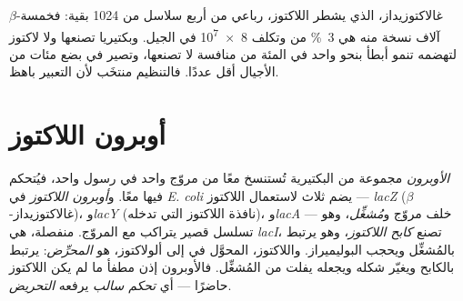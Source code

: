 \begin{example}\label{ex:b1:expression-control:economy}
 $\beta$-غالاكتوزيداز، الذي يشطر اللاكتوز، رباعي من أربع
سلاسل من \qty{1024}{} بقية: فخمسة آلاف نسخة منه هي \qty{3}{\%} من
  وتكلف \qty{8e7}{}  في الجيل. وبكتيريا تصنعها ولا
لاكتوز لتهضمه تنمو أبطأ بنحو واحد في المئة من منافسة لا تصنعها،
وتصير في بضع مئات من الأجيال أقل عددًا. فالتنظيم منتخَب لأن التعبير
باهظ.
\end{example}

\section{أوبرون اللاكتوز}

\begin{definition}\label{def:b1:expression-control:operon}
\emph{الأوبرون} مجموعة من  البكتيرية تُستنسخ معًا من مروّج
واحد في رسول واحد، فيُتحكم فيها معًا. و\emph{أوبرون اللاكتوز} في
\emph{E. coli} يضم ثلاث  لاستعمال اللاكتوز --- \emph{lacZ}
($\beta$-غالاكتوزيداز)، و\emph{lacY} (نافذة اللاكتوز التي تدخله)،
و\emph{lacA} --- خلف مروّج و\emph{مُشغِّل}، وهو تسلسل قصير يتراكب مع
المروّج.  منفصلة، هي \emph{lacI}، تصنع \emph{كابح
اللاكتوز}، وهو  يرتبط بالمُشغِّل ويحجب البوليميراز. واللاكتوز،
المحوَّل في  إلى ألولاكتوز، هو \emph{المحرِّض}: يرتبط بالكابح
ويغيّر شكله ويجعله يفلت من المُشغِّل. فالأوبرون إذن مطفأ ما لم يكن
اللاكتوز حاضرًا --- أي \emph{تحكم سالب} يرفعه \emph{التحريض}.
\end{definition}

